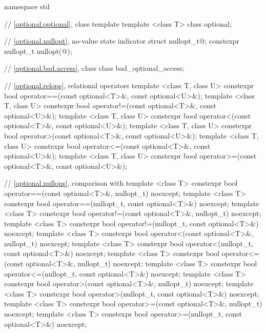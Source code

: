 %
%
\begin{codeblock}
namespace std {
  // \ref{optional.optional}, class template 
  template <class T>
    class optional;

  // \ref{optional.nullopt}, no-value state indicator
  struct nullopt_t{@\seebelow@};
  constexpr nullopt_t nullopt(@\unspec@);

  // \ref{optional.bad.access}, class 
  class bad_optional_access;

  // \ref{optional.relops}, relational operators
  template <class T, class U>
  constexpr bool operator==(const optional<T>&, const optional<U>&);
  template <class T, class U>
  constexpr bool operator!=(const optional<T>&, const optional<U>&);
  template <class T, class U>
  constexpr bool operator<(const optional<T>&, const optional<U>&);
  template <class T, class U>
  constexpr bool operator>(const optional<T>&, const optional<U>&);
  template <class T, class U>
  constexpr bool operator<=(const optional<T>&, const optional<U>&);
  template <class T, class U>
  constexpr bool operator>=(const optional<T>&, const optional<U>&);

  // \ref{optional.nullops}, comparison with 
  template <class T> constexpr bool operator==(const optional<T>&, nullopt_t) noexcept;
  template <class T> constexpr bool operator==(nullopt_t, const optional<T>&) noexcept;
  template <class T> constexpr bool operator!=(const optional<T>&, nullopt_t) noexcept;
  template <class T> constexpr bool operator!=(nullopt_t, const optional<T>&) noexcept;
  template <class T> constexpr bool operator<(const optional<T>&, nullopt_t) noexcept;
  template <class T> constexpr bool operator<(nullopt_t, const optional<T>&) noexcept;
  template <class T> constexpr bool operator<=(const optional<T>&, nullopt_t) noexcept;
  template <class T> constexpr bool operator<=(nullopt_t, const optional<T>&) noexcept;
  template <class T> constexpr bool operator>(const optional<T>&, nullopt_t) noexcept;
  template <class T> constexpr bool operator>(nullopt_t, const optional<T>&) noexcept;
  template <class T> constexpr bool operator>=(const optional<T>&, nullopt_t) noexcept;
  template <class T> constexpr bool operator>=(nullopt_t, const optional<T>&) noexcept;

}
\end{codeblock}
